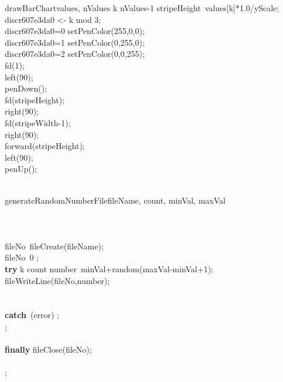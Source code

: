 \documentclass[a4paper,10pt]{article}
\begin{document}
\begin{pseudocode}{drawBarChart}{values, nValues }
  \FOR k  \TO nValues-1  \DO
  \BEGIN
    stripeHeight\gets\ values[k]*1.0/yScale;\\
    discr607e3da0 <- k mod 3;\\
    \IF discr607e3da0=0 \THEN
      setPenColor(255,0,0);\\
    \ELSEIF discr607e3da0=1 \THEN
      setPenColor(0,255,0);\\
    \ELSEIF discr607e3da0=2 \THEN
      setPenColor(0,0,255);\\
    fd(1);\\
    left(90);\\
    penDown();\\
    fd(stripeHeight);\\
    right(90);\\
    fd(stripeWidth-1);\\
    right(90);\\
    forward(stripeHeight);\\
    left(90);\\
    penUp();\\
  \END\\
\ENDPROCEDURE
\end{pseudocode}


\begin{pseudocode}{generateRandomNumberFile}{fileName, count, minVal, maxVal }
\label{generateRandomNumberFile}
\\
\\
\\
\\
  fileNo\gets\ fileCreate(fileName);\\
  \IF fileNo\leq\ 0 \THEN
    ;\\
  \textbf{try} \BEGIN
    \FOR k  \TO count  \DO
    \BEGIN
      number\gets\ minVal+random(maxVal-minVal+1);\\
      fileWriteLine(fileNo,number);\\
    \END\\
  \END\\
  \textbf{catch}\ (error)\BEGIN
    ;\\
    ;\\
  \END\\
  \textbf{finally} \BEGIN
    fileClose(fileNo);\\
  \END\\
  ;\\
\ENDPROCEDURE
\end{pseudocode}
\end{document}
